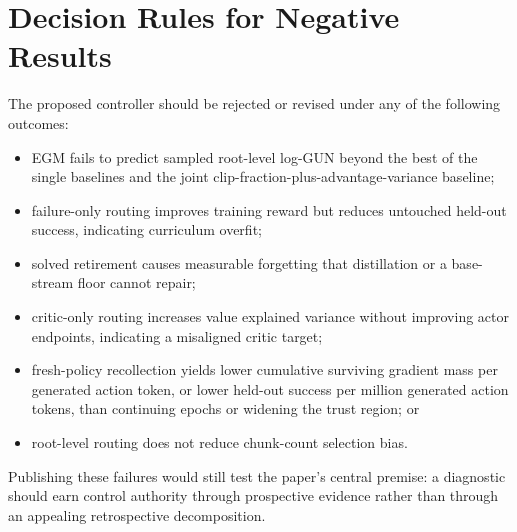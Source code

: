 \documentclass{article}
\begin{document}
\section{Decision Rules for Negative Results}

The proposed controller should be rejected or revised under any of the
following outcomes:
\begin{itemize}[leftmargin=*]
  \item EGM fails to predict sampled root-level log-GUN beyond the best of the
  single baselines and the joint clip-fraction-plus-advantage-variance baseline;
  \item failure-only routing improves training reward but reduces untouched
  held-out success, indicating curriculum overfit;
  \item solved retirement causes measurable forgetting that distillation or a
  base-stream floor cannot repair;
  \item critic-only routing increases value explained variance without
  improving actor endpoints, indicating a misaligned critic target;
  \item fresh-policy recollection yields lower cumulative surviving gradient
  mass per generated action token, or lower held-out success per million
  generated action tokens, than continuing epochs or widening the trust region; or
  \item root-level routing does not reduce chunk-count selection bias.
\end{itemize}
Publishing these failures would still test the paper's central premise: a
diagnostic should earn control authority through prospective evidence rather
than through an appealing retrospective decomposition.
\end{document}

